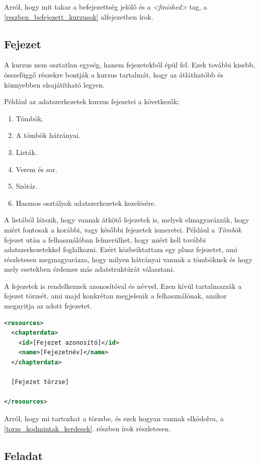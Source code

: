 \documentclass[12pt,a4paper]{article}
\begin{document}
	Arról, hogy mit takar a befejezettség jelölő és a \textit{<finished>} tag, a \ref{reszben_befejezett_kurzusok} alfejezetben írok.
	
	\subsection{Fejezet}\label{fejezet}
	
	A kurzus nem osztatlan egység, hanem fejezetekből épül fel. Ezek további kisebb, összefüggő részekre bontják a kurzus tartalmát, hogy az átláthatóbb és könnyebben elsajátítható legyen.
	
	Például az adatszerkezetek kurzus fejezetei a következők:
	
	\begin{enumerate}
		\item Tömbök.
		\item A tömbök hátrányai.
		\item Listák.
		\item Verem és sor.
		\item Szótár.
		\item Hasznos osztályok adatszerkezetek kezelésére.
	\end{enumerate}  

	A listából látszik, hogy vannak átkötő fejezetek is, melyek elmagyarázzák, hogy miért fontosak a korábbi, vagy későbbi fejezetek ismeretei. Például a \textit{Tömbök} fejezet után a felhasználóban felmerülhet, hogy miért kell további adatszerkezetekkel foglalkozni. Ezért közbeiktattam egy plusz fejezetet, ami részletesen megmagyarázza, hogy milyen hátrányai vannak a tömböknek és hogy mely esetekben érdemes más adatstruktúrát választani.
	
	A fejezetek is rendelkeznek azonosítóval és névvel. Ezen kívül tartalmazzák a fejezet törzsét, ami majd konkrétan megjelenik a felhasználónak, amikor megnyitja az adott fejezetet. 
	
	\begin{lstlisting}[language=XML]
<resources>
  <chapterdata>
	<id>[Fejezet azonosító]</id>
    <name>[Fejezetnév]</name>
  </chapterdata>

  [Fejezet törzse]	
	
</resources>
	\end{lstlisting}
	
	Arról, hogy mi tartozhat a törzsbe, és ezek hogyan vannak elkódolva, a \ref{torzs_kodmintak_kerdesek}. részben írok részletesen.
	
	\subsection{Feladat}\label{feladat}
	
\end{document}
